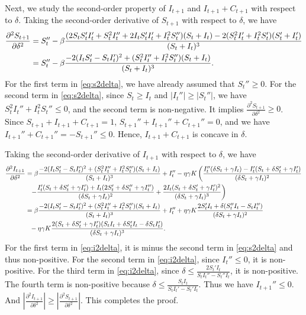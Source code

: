 \documentclass[nonblindrev, copyedit]{informs3a}
\newcounter{prop}[chapter]
\begin{document}
Next, we study the second-order property of $I_{t+1}$ and $I_{t+1}+C_{t+1}$ with respect to $\delta$.
Taking the second-order derivative of $S_{t+1}$ with respect to $\delta$, we have
\begin{align}
    \frac{\partial^2 S_{t+1}}{\partial \delta^2}&=S_{t}''-\beta\frac{(2S_{t}S_{t}'I_{t}'+S_{t}^2I_{t}''+2I_{t}S_{t}'I_{t}'+I_{t}^2S_{t}'')(S_{t}+I_{t})-2(S_{t}^2I_{t}'+I_{t}^2S_{t}')(S_{t}'+I_{t}')}{(S_{t}+I_{t})^3}\notag\\
    &=S_{t}''-\beta\frac{-2(I_{t}S_{t}'-S_{t}I_{t}')^2+(S_{t}^2I_{t}''+I_{t}^2S_{t}'')(S_{t}+I_{t})}{(S_{t}+I_{t})^3}.\label{eq:s2delta}
\end{align}
For the first term in \eqref{eq:s2delta}, we have already assumed that $S_t''\ge0$. For the second term in \eqref{eq:s2delta}, since $S_t\ge I_t$ and $|I_{t}''|\ge|S_{t}''|$, we have $S_{t}^2I_{t}''+I_{t}^2S_{t}''\le0$, and the second term is non-negative.
It implies $\frac{\partial^2 S_{t+1}}{\partial \delta^2}\ge0$. Since $S_{t+1}+I_{t+1}+C_{t+1}=1$, $S_{t+1}''+I_{t+1}''+C_{t+1}''=0$, and we have $I_{t+1}''+C_{t+1}''=-S_{t+1}''\le0$. Hence, $I_{t+1}+C_{t+1}$ is concave in $\delta$.

Taking the second-order derivative of $I_{t+1}$ with respect to $\delta$, we have
\begin{align}
    \frac{\partial^2 I_{t+1}}{\partial \delta^2}&=\beta\frac{-2(I_{t}S_{t}'-S_{t}I_{t}')^2+(S_{t}^2I_{t}''+I_{t}^2S_{t}'')(S_{t}+I_{t})}{(S_{t}+I_{t})^3}+I_{t}''-\eta\gamma K\left({\frac{I_{t}''(\delta S_{t}+\gamma I_{t})-I_{t}'(S_{t}+\delta S_{t}'+\gamma I_{t}')}{(\delta S_{t}+\gamma I_{t})^2}}\right.\notag\\
    &\ \ \left.{-\frac{I_{t}'(S_{t}+\delta S_{t}'+\gamma I_{t}')+I_{t}(2S_{t}'+\delta S_{t}''+\gamma I_{t}'')}{(\delta S_{t}+\gamma I_{t})^2}+\frac{2I_{t}(S_{t}+\delta S_{t}'+\gamma I_{t}')^2}{(\delta S_{t}+\gamma I_{t})^3}}\right)\notag\\
    &=\beta\frac{-2(I_{t}S_{t}'-S_{t}I_{t}')^2+(S_{t}^2I_{t}''+I_{t}^2S_{t}'')(S_{t}+I_{t})}{(S_{t}+I_{t})^3}+I_{t}''+\eta\gamma K\frac{2S_{t}'I_{t}+\delta(S_{t}''I_{t}-S_{t}I_{t}'')}{(\delta S_{t}+\gamma I_{t})^2}\notag\\
    &\ \ -\eta\gamma K\frac{2(S_{t}+\delta S_{t}'+\gamma I_{t}')(S_{t}I_{t}+\delta S_{t}'I_{t}-\delta S_{t}I_{t}')}{(\delta S_{t}+\gamma I_{t})^3}.\label{eq:i2delta}
\end{align}
For the first term in \eqref{eq:i2delta}, it is minus the second term in \eqref{eq:s2delta} and thus non-positive.
For the second term in \eqref{eq:i2delta}, since $I_{t}''\le0$, it is non-positive.
For the third term in \eqref{eq:i2delta}, since $\delta\le\frac{2S_{t}'I_{t}}{S_{t}I_{t}''-S_{t}''I_{t}}$, it is non-positive.
The fourth term is non-positive because $\delta\le\frac{S_{t}I_{t}}{S_{t}I_{t}'-S_{t}'I_{t}}$. Thus we have $I_{t+1}''\le0$. And $|\frac{\partial^2 I_{t+1}}{\partial \delta^2}|\ge|\frac{\partial^2 S_{t+1}}{\partial \delta^2}|$.
This completes the proof.\Halmos
\endproof
\end{document}
